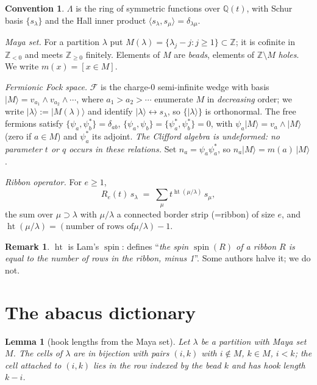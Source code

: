 \documentclass[11pt]{article}
\newtheorem{lemma}[theorem]{Lemma}
\theoremstyle{definition}
\newtheorem{remark}[theorem]{Remark}
\newtheorem{convention}[theorem]{Convention}
\DeclareMathOperator{\spin}{spin}
\newcommand{\hgt}{\operatorname{ht}}          %
\newcommand{\Z}{\mathbb{Z}}
\newcommand{\Q}{\mathbb{Q}}
\newcommand{\Lam}{\Lambda}
\newcommand{\F}{\mathcal{F}}
\begin{document}
\begin{convention}\label{conv:main}
$\Lam$ is the ring of symmetric functions over $\Q(t)$, with Schur basis
$\{s_\lambda\}$ and the Hall inner product $\langle s_\lambda,s_\mu\rangle=
\delta_{\lambda\mu}$.

\emph{Maya set.} For a partition $\lambda$ put
$M(\lambda)=\{\lambda_j-j:j\ge1\}\subset\Z$; it is cofinite in $\Z_{<0}$ and meets
$\Z_{\ge0}$ finitely.  Elements of $M$ are \emph{beads}, elements of
$\Z\setminus M$ \emph{holes}.  We write $m(x)=[x\in M]$.

\emph{Fermionic Fock space.} $\F$ is the charge-$0$ semi-infinite wedge with basis
$|M\rangle=v_{a_1}\wedge v_{a_2}\wedge\cdots$, where $a_1>a_2>\cdots$ enumerate $M$
in \emph{decreasing} order; we write $|\lambda\rangle:=|M(\lambda)\rangle$ and
identify $|\lambda\rangle\leftrightarrow s_\lambda$, so $\{|\lambda\rangle\}$ is
orthonormal.  The free fermions satisfy
$\{\psi_a,\psi_b^{*}\}=\delta_{ab}$, $\{\psi_a,\psi_b\}=\{\psi_a^{*},\psi_b^{*}\}=0$,
with $\psi_a|M\rangle=v_a\wedge|M\rangle$ (zero if $a\in M$) and $\psi_a^{*}$ its
adjoint. \emph{The Clifford algebra is undeformed: no parameter $t$ or $q$ occurs
in these relations.}
Set $n_a=\psi_a\psi_a^{*}$, so $n_a|M\rangle=m(a)\,|M\rangle$.

\emph{Ribbon operator.} For $e\ge1$,
\[
  R_e(t)\,s_\lambda \;=\; \sum_{\mu} t^{\hgt(\mu/\lambda)}\,s_\mu,
\]
the sum over $\mu\supset\lambda$ with $\mu/\lambda$ a connected border strip
(=ribbon) of size $e$, and $\hgt(\mu/\lambda)=(\text{number of rows of
}\mu/\lambda)-1$.
\end{convention}

\begin{remark}
$\hgt$ is Lam's $\spin$: \cite[\S2]{Lam0409463} defines
``\emph{the spin $\spin(R)$ of a ribbon $R$ is equal to the number of rows in the
ribbon, minus 1}''. Some authors halve it; we do not.
\end{remark}

\section{The abacus dictionary}

\begin{lemma}[hook lengths from the Maya set]\label{lem:hooks}
Let $\lambda$ be a partition with Maya set $M$.  The cells of $\lambda$ are in
bijection with pairs $(i,k)$ with $i\notin M$, $k\in M$, $i<k$; the cell attached to
$(i,k)$ lies in the row indexed by the bead $k$ and has hook length $k-i$.
\end{lemma}
\end{document}
